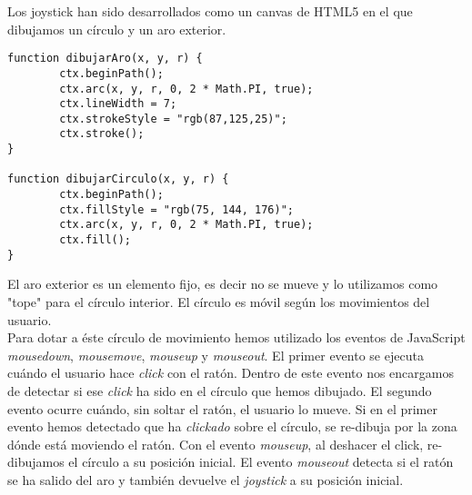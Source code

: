 Los joystick han sido desarrollados como un canvas de HTML5 en el que dibujamos un círculo y un aro exterior.\\

\begin{lstlisting}[caption=Aro y círculo del joystick.]
function dibujarAro(x, y, r) {
        ctx.beginPath();
        ctx.arc(x, y, r, 0, 2 * Math.PI, true);
        ctx.lineWidth = 7;
        ctx.strokeStyle = "rgb(87,125,25)";
        ctx.stroke();
}

function dibujarCirculo(x, y, r) {
        ctx.beginPath();
        ctx.fillStyle = "rgb(75, 144, 176)";
        ctx.arc(x, y, r, 0, 2 * Math.PI, true);
        ctx.fill();
}
\end{lstlisting}


El aro exterior es un elemento fijo, es decir no se mueve y lo utilizamos como "tope" para el círculo interior. El círculo es móvil según los movimientos del usuario.\\

Para dotar a éste círculo de movimiento hemos utilizado los eventos de JavaScript \emph{mousedown}, \emph{mousemove}, \emph{mouseup} y \emph{mouseout}. El primer evento se ejecuta cuándo el usuario hace \emph{click} con el ratón. Dentro de este evento nos encargamos de detectar si ese \emph{click} ha sido en el círculo que hemos dibujado. El segundo evento ocurre cuándo, sin soltar el ratón, el usuario lo mueve. Si en el primer evento hemos detectado que ha \emph{clickado} sobre el círculo, se re-dibuja por la zona dónde está moviendo el ratón. Con el evento \emph{mouseup}, al deshacer el click, re-dibujamos el círculo a su posición inicial. El evento \emph{mouseout} detecta si el ratón se ha salido del aro y también devuelve el \emph{joystick} a su posición inicial.\\

